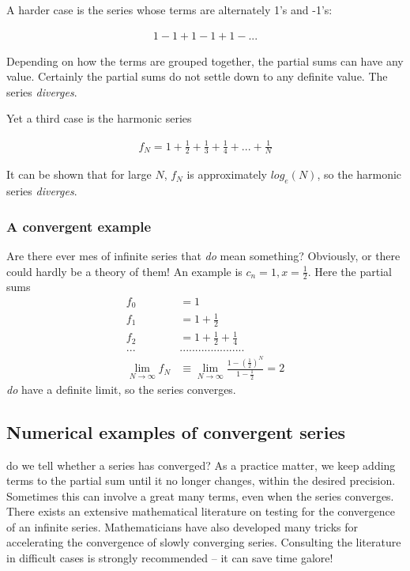 A harder case is the series whose terms are alternately 1's and -1's:

\begin{align}
    1 - 1 + 1 - 1 + 1 - ...
\end{align}

Depending on how the terms are grouped together, the partial
sums can have any value. Certainly the partial sums do not settle
down to any definite value. The series \textit{diverges}.

Yet a third case is the harmonic series

\begin{align}
    f_{N} = 1 + \frac{1}{2} + \frac{1}{3} + \frac{1}{4} + ... + \frac{1}{N}
\end{align}

It can be shown that for large $N$, $f_{N}$ is approximately $log_{e}(N)$, so the harmonic series \textit{diverges}.

\subsubsection{A convergent example}
Are there ever mes of infinite series that \textit{do} mean something? Obviously, or there could hardly be a theory of them! An example is $c_{n}=1, x = \frac{1}{2}$. Here the partial sums
\begin{equation}
\begin{aligned}
f_{0} &= 1                               \\
f_{1} &= 1 + \frac{1}{2}                 \\
f_{2} &= 1 + \frac{1}{2} + \frac{1}{4}   \\
...&.....................                \\
\lim_{N\to\infty} f_{N} &\equiv \lim_{N\to\infty} \frac{1-(\frac{1}{2})^{N}}{1-\frac{1}{2}} = 2
    \label{eq:06_06}
\end{aligned}
\end{equation}
\textit{do} have a definite limit, so the series converges.

\subsection{Numerical examples of convergent series}
 do we tell whether a series has converged? As a practice matter, we keep adding terms to the partial sum until it no longer changes, within the desired precision. Sometimes this can involve a great many terms, even when the series converges. There exists an extensive mathematical literature on testing for the convergence of an infinite series. Mathematicians have also developed many tricks for accelerating the convergence of slowly converging series. Consulting the literature in difficult cases is strongly recommended -- it can save time galore!

